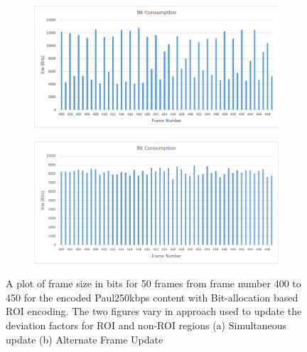 \documentclass[11pt]{article} %
\begin{document}
\begin{figure}
	\centering
	\begin{subfigure}[t]{\textwidth}
		\centering
		\includegraphics[width=\textwidth]{RC_bit_allocation/Oscillation/Paul250kbps_RC_bit_alloc_osc.png}
		\caption{}
		\label{fig: ROI bit-alloc oscc}
	\end{subfigure}
	\begin{subfigure}[t]{\textwidth}
		\centering
		\includegraphics[width=\textwidth]{RC_bit_allocation/Oscillation/Paul250kbps_RC_bit_alloc_corrected_osc.png}
		\caption{}
		\label{fig: ROI bit-alloc oscc corrected}
	\end{subfigure}
	\caption{A plot of frame size in bits for 50 frames from frame number 400 to 450 for the encoded Paul250kbps content with Bit-allocation based ROI encoding. The two figures vary in approach used to update the deviation factors for ROI and non-ROI regions (a) Simultaneous update (b) Alternate Frame Update}
	\label{fig: ROI bit-alloc oscc example}
\end{figure}
\end{document}
